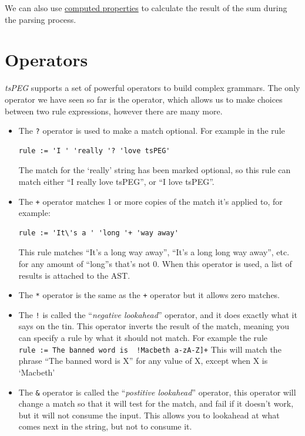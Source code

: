 We can also use \protect\hyperlink{computed-properties}{computed
properties} to calculate the result of the sum during the parsing
process.

\hypertarget{operators}{\section{Operators}\label{operators}}

\emph{tsPEG} supports a set of powerful operators to build complex
grammars. The only operator we have seen so far is the
\texttt{\textbar{}} operator, which allows us to make choices between
two rule expressions, however there are many more.

\begin{itemize}
\item
  The \texttt{?} operator is used to make a match optional. For example
  in the rule

\begin{verbatim}
rule := 'I ' 'really '? 'love tsPEG'
\end{verbatim}

  The match for the `really' string has been marked optional, so this
  rule can match either ``I really love tsPEG'', or ``I love tsPEG''.
\item
  The \texttt{+} operator matches 1 or more copies of the match it's
  applied to, for example:

\begin{verbatim}
rule := 'It\'s a ' 'long '+ 'way away'
\end{verbatim}

  This rule matches ``It's a long way away'', ``It's a long long way
  away'', etc. for any amount of ``long''s that's not 0. When this
  operator is used, a list of results is attached to the AST.
\item
  The \texttt{*} operator is the same as the \texttt{+} operator but it
  allows zero matches.
\item
  The \texttt{!} is called the ``\emph{negative lookahead}'' operator,
  and it does exactly what it says on the tin. This operator inverts the
  result of the match, meaning you can specify a rule by what it should
  not match. For example the rule
  \texttt{rule\ :=\ \textquotesingle{}The\ banned\ word\ is\ \textquotesingle{}\ !\textquotesingle{}Macbeth\textquotesingle{}\ \textquotesingle{}{[}a-zA-Z{]}+\textquotesingle{}}
  This will match the phrase ``The banned word is X'' for any value of
  X, except when X is `Macbeth'
\item
  The \texttt{\&} operator is called the ``\emph{postitive lookahead}''
  operator, this operator will change a match so that it will test for
  the match, and fail if it doesn't work, but it will not consume the
  input. This allows you to lookahead at what comes next in the string,
  but not to consume it.
\end{itemize}

